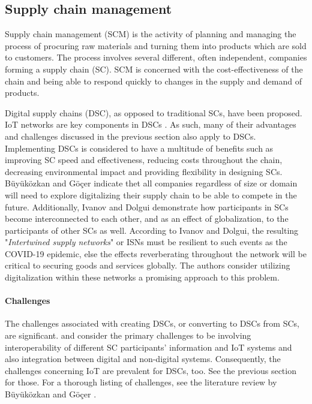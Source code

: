 \subsection{Supply chain management}


Supply chain management (SCM) is the activity of planning and managing
the process of procuring raw materials and turning them into products
which are sold to customers. The process involves several different,
often independent, companies forming a supply chain (SC). SCM is
concerned with the cost-effectiveness of the chain and being able to
respond quickly to changes in the supply and demand of products. 

Digital supply chains (DSC), as opposed to traditional SCs, have been
proposed. IoT networks are key components in DSCs \cite{panInteroperability}. As such, many of
their advantages and challenges discussed in the previous section also
apply to DSCs. Implementing DSCs is considered to have a multitude of
benefits
\cite{buyukozkanDigital,kimImpact,korpelaDSC,maullDistributed,neubertCollaboration,santosOrganizational}
such as improving SC speed and effectiveness, reducing costs
throughout the chain, decreasing environmental impact and providing
flexibility in designing SCs. B\"uy\"uk\"ozkan and G\"o\c{c}er
\cite{buyukozkanDigital} indicate thet all companies regardless of
size or domain will need to explore digitalizing their supply chain to
be able to compete in the future. Additionally, Ivanov and Dolgui
\cite{ivanovIntertwined} demonstrate how participants in SCs become
interconnected to each other, and as an effect of globalization, to
the participants of other SCs as well. According to Ivanov and Dolgui,
the resulting "\textit{Intertwined supply networks}" or ISNs must be
resilient to such events as the COVID-19 epidemic, else the effects
reverberating throughout the network will be critical to securing
goods and services globally. The authors consider utilizing
digitalization within these networks a promising approach to this
problem.

\paragraph{Challenges} The challenges associated with creating DSCs,
or converting to DSCs from SCs, are significant.
\cite{panInteroperability} and \cite{xuManaging} consider the primary
challenges to be involving interoperability of different SC
participants' information and IoT systems and also integration between
digital and non-digital systems. Consequently, the challenges
concerning IoT are prevalent for DSCs, too. See the previous section
for those. For a thorough listing of challenges, see the literature
review by B\"uy\"uk\"ozkan and G\"o\c{c}er \cite{buyukozkanDigital}.

